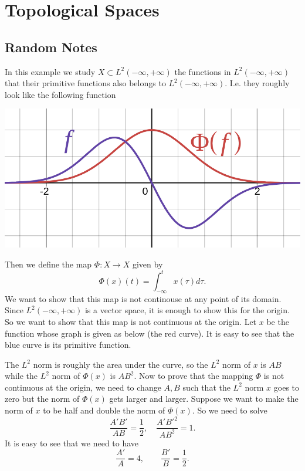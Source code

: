 \chapter{Topological Spaces}



\section{Random Notes}

\begin{observation}
	In this example we study $ X\subset L^2(-\infty,+\infty) $ the functions in $ L^2(-\infty,+\infty) $ that their primitive functions also belongs to $ L^2(-\infty,+\infty) $. I.e. they roughly look like the following function
	\begin{center}
		\includegraphics[width=0.4\linewidth]{Images/L2WithL2Primitive.png}
	\end{center}
	Then we define the map $ \Phi: X\to X $ given by
	\[ \Phi(x)(t) = \int_{-\infty}^{t} x(\tau) d\tau. \]
	We want to show that this map is not continouse at any point of its domain. Since $ L^2(-\infty,+\infty) $ is a vector space, it is enough to show this for the origin. So we want to show that this map is not continuous at the origin. Let $ x $ be the function whose graph is given as below (the red curve). It is easy to see that the blue curve is its primitive function.
	
		
	 The $ L^2 $ norm is roughly the area under the curve, so the $ L^2 $ norm of $ x $ is $ AB $ while the $ L^2 $ norm of $ \Phi(x) $ is $ AB^2 $. Now to prove that the mapping $ \Phi $ is not continuous at the origin, we need to change $ A,B $ such that the $ L^2 $ norm $ x $ goes to zero but the norm of $ \Phi(x) $ gets larger and larger. Suppose we want to make the norm of $ x $ to be half and double the norm of $ \Phi(x) $. So we need to solve
	\[ \frac{A'B'}{AB} = \frac{1}{2}, \quad \frac{A'B'^2}{AB^2} = 1. \]
	It is easy to see that we need to have
	\[ \frac{A'}{A} = 4, \qquad \frac{B'}{B} = \frac{1}{2}. \]

\end{observation}

